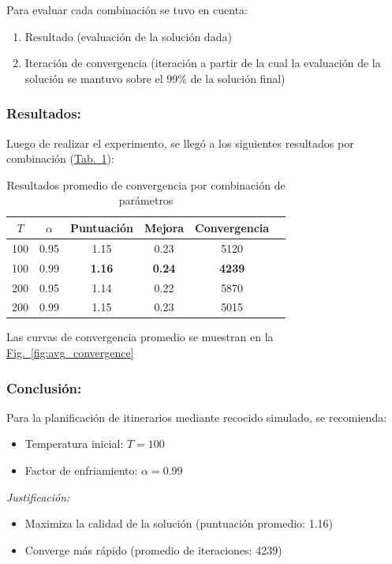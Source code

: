 \documentclass[10pt]{llncs}
\newcommand{\figref}[1]{\hyperref[#1]{Fig.~\ref*{#1}}}
\newcommand{\tabref}[1]{\hyperref[#1]{Tab.~\ref*{#1}}}
\begin{document}
Para evaluar cada combinación se tuvo en cuenta:
\begin{enumerate}
    \item Resultado (evaluación de la solución dada)
    \item Iteración de convergencia (iteración a partir de la cual la evaluación de la solución se mantuvo sobre el 99\% de la solución final)
\end{enumerate}

\subsubsection{Resultados:}

Luego de realizar el experimento, se llegó a los siguientes resultados por combinación
(\tabref{tab:resultados-finales}):

\begin{table}[h]
\centering
\caption{Resultados promedio de convergencia por combinación de parámetros}
\label{tab:resultados-finales}
\begin{tabular}{cccccc}
\toprule
$T$ & $\alpha$ & Puntuación & Mejora & Convergencia \\
\midrule
100 & 0.95 & 1.15 & 0.23 & 5120 \\
100 & 0.99 & \textbf{1.16} & \textbf{0.24} & \textbf{4239} \\
200 & 0.95 & 1.14 & 0.22 & 5870 \\
200 & 0.99 & 1.15 & 0.23 & 5015 \\
\bottomrule
\end{tabular}
\end{table}

\begin{remark}
Las curvas de convergencia promedio se muestran en la {\figref{fig:avg_convergence}}
\end{remark}

\subsubsection{Conclusión:}
Para la planificación de itinerarios mediante recocido simulado, se recomienda:


\begin{itemize}
    \item Temperatura inicial: $T = 100$
    \item Factor de enfriamiento: $\alpha = 0.99$
\end{itemize}

\textit{Justificación:}
\begin{itemize}
    \item Maximiza la calidad de la solución (puntuación promedio: 1.16)
    \item Converge más rápido  (promedio de iteraciones: 4239)
\end{itemize}
\end{document}
